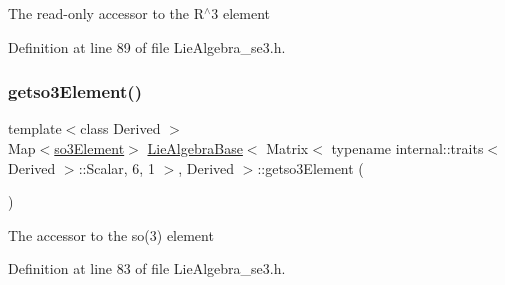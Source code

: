 The read-\/only accessor to the R$^\wedge$3 element 

Definition at line 89 of file Lie\+Algebra\+\_\+se3.\+h.

\hypertarget{class_lie_algebra_base_3_01_matrix_3_01typename_01internal_1_1traits_3_01_derived_01_4_1_1_scala449314c781550590437697c4dc21a6d4_a3b744e47da7a539a3689498fa473feb0}{}\label{class_lie_algebra_base_3_01_matrix_3_01typename_01internal_1_1traits_3_01_derived_01_4_1_1_scala449314c781550590437697c4dc21a6d4_a3b744e47da7a539a3689498fa473feb0} 
\subsubsection{\texorpdfstring{getso3\+Element()}{getso3Element()}\hspace{0.1cm}{\footnotesize\ttfamily [1/2]}}
{\footnotesize\ttfamily template$<$class Derived $>$ \\
Map$<$\hyperlink{class_lie_algebra_base_3_01_matrix_3_01typename_01internal_1_1traits_3_01_derived_01_4_1_1_scala449314c781550590437697c4dc21a6d4_aee714752364bcba43e97f130091fcc6e}{so3\+Element}$>$ \hyperlink{class_lie_algebra_base}{Lie\+Algebra\+Base}$<$ Matrix$<$ typename internal\+::traits$<$ Derived $>$\+::Scalar, 6, 1 $>$, Derived $>$\+::getso3\+Element (\begin{DoxyParamCaption}{ }\end{DoxyParamCaption})\hspace{0.3cm}{\ttfamily [inline]}}

The accessor to the so(3) element 

Definition at line 83 of file Lie\+Algebra\+\_\+se3.\+h.

\hypertarget{class_lie_algebra_base_3_01_matrix_3_01typename_01internal_1_1traits_3_01_derived_01_4_1_1_scala449314c781550590437697c4dc21a6d4_a5ea80dc504dc702739a6e8020d503fb7}{}\label{class_lie_algebra_base_3_01_matrix_3_01typename_01internal_1_1traits_3_01_derived_01_4_1_1_scala449314c781550590437697c4dc21a6d4_a5ea80dc504dc702739a6e8020d503fb7} 
